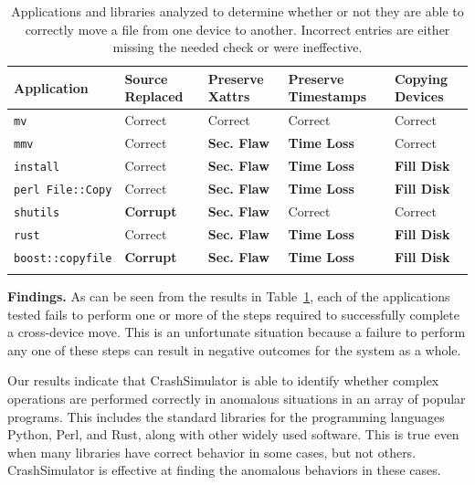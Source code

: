  \begin{table}[t]
    \scriptsize{}
    \begin{tabular}{l p{1cm} p{1cm} p{1.2cm} p{1cm}}
    \toprule{}
        Application     & Source Replaced & Preserve Xattrs & Preserve Timestamps & Copying Devices\\
\hline
        {\tt mv}              & Correct             & Correct         & Correct             & Correct\\
        {\tt mmv}             & Correct             & {\bf Sec. Flaw} & {\bf Time Loss} & Correct\\
        {\tt install}         & Correct             & {\bf Sec. Flaw} & {\bf Time Loss} & {\bf Fill Disk} \\
        {\tt perl File::Copy} & Correct             & {\bf Sec. Flaw} & {\bf Time Loss} & {\bf Fill Disk} \\
        {\tt shutils}         & {\bf Corrupt}	& {\bf Sec. Flaw} 	& Correct             & Correct\\
        {\tt rust}             & Correct             & {\bf Sec. Flaw} & {\bf Time Loss} & {\bf Fill Disk} \\
        {\tt boost::copyfile} & {\bf Corrupt}	      & {\bf Sec. Flaw} & {\bf Time Loss} & {\bf Fill Disk} \\
    \bottomrule{}
    \end{tabular}
    \caption{Applications and libraries analyzed to determine whether or not
      they are able to correctly move a file from one device to another.
Incorrect entries are either missing the needed check or were ineffective.}
    \label{table:crossdevice}
\end{table}

{\bf Findings.}
As can be seen from the results in Table~\ref{table:crossdevice}, each of the
applications tested fails to perform one or more of the steps required to
successfully complete a cross-device move.  This is an unfortunate situation
because a failure to perform any one of these steps can result in negative
outcomes for the system as a whole.

Our results indicate that CrashSimulator is able to identify whether complex
operations are performed correctly in anomalous situations in
an array of popular programs.
This includes the standard libraries for the programming languages Python,
Perl, and Rust, along with other widely used software.  This is true even
when many libraries have correct behavior in some cases, but not others.
CrashSimulator is effective at finding the anomalous behaviors in these
cases.


